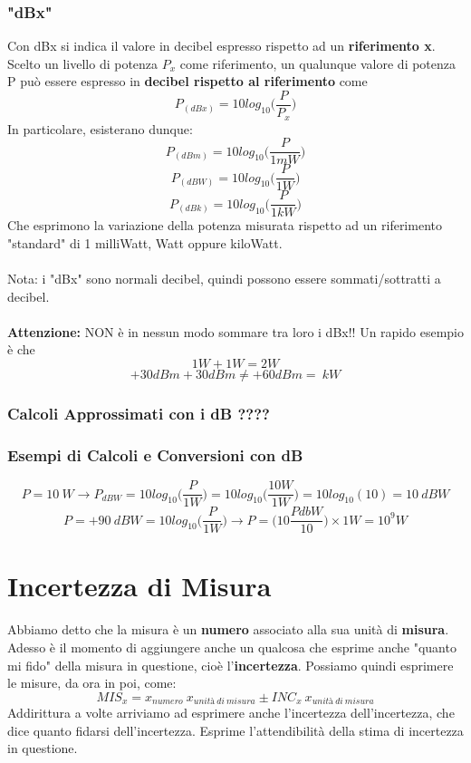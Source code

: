 \documentclass[a4paper,11pt]{report}
\begin{document}
\subsection*{"dBx"}
Con dBx si indica il valore in decibel espresso rispetto ad un \textbf{riferimento x}. Scelto un livello di potenza $P_{x}$ come riferimento, un qualunque valore di potenza P può essere espresso in \textbf{decibel rispetto al riferimento} come
$$
  P_{(dBx)} = 10log_{10}\Bigg( \frac{P}{P_{x}} \Bigg)
$$
In particolare, esisterano dunque:
$$P_{(dBm)} = 10log_{10}\Bigg( \frac{P}{1mW} \Bigg)$$
$$P_{(dBW)} = 10log_{10}\Bigg( \frac{P}{1W} \Bigg)$$
$$P_{(dBk)} = 10log_{10}\Bigg( \frac{P}{1kW} \Bigg)$$
Che esprimono la variazione della potenza misurata rispetto ad un riferimento "standard" di 1 milliWatt, Watt oppure kiloWatt.\\ \\
Nota: i "dBx" sono normali decibel, quindi possono essere sommati/sottratti a decibel.\\ \\
{\Large {\textbf{Attenzione:}}} NON è in nessun modo sommare tra loro i dBx!! Un rapido esempio è che
$$1 W + 1 W = 2 W$$
$$+30 dBm + 30 dBm \neq + 60 dBm = \ kW$$
\subsection*{Calcoli Approssimati con i dB ????}
\subsection{Esempi di Calcoli e Conversioni con dB}
$$P = 10\ W \rightarrow P_{dBW} = 10 log_{10}\Bigg(\frac{P}{1W}\Bigg) = 10 log_{10}\Bigg(\frac{10 W}{1 W}\Bigg) = 10 log_{10}(10) = 10\ dBW$$
$$P = +90\ dBW = 10 log_{10}\Bigg(\frac{P}{1W}\Bigg) \rightarrow P = \Bigg( 10 \frac{PdbW}{10}\Bigg)\times 1 W = 10^9 W $$
\newpage
\chapter{Incertezza di Misura}
Abbiamo detto che la misura è un \textbf{numero} associato alla sua unità di \textbf{misura}. Adesso è il momento di aggiungere anche un qualcosa che esprime anche "quanto mi fido" della misura in questione, cioè l'\textbf{incertezza}. Possiamo quindi esprimere le misure, da ora in poi, come: $$ MIS_{x} = x_{numero}\ x_{unità\ di\ misura} \pm INC_{x}\ x_{unità\ di\ misura} $$
Addirittura a volte arriviamo ad esprimere anche l'incertezza dell'incertezza, che dice quanto fidarsi dell'incertezza. Esprime l'attendibilità della stima di incertezza in questione.
\end{document}
